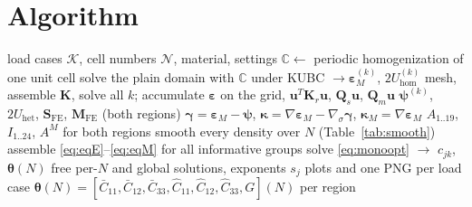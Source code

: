 \documentclass[11pt,a4paper]{article}
\newcommand{\C}{\mathbb{C}}                     %
\newcommand{\Cb}{\bar{\mathbb{C}}}              %
\newcommand{\Ch}{\hat{\mathbb{C}}}              %
\newcommand{\eps}{\bm{\varepsilon}}
\newcommand{\epsM}{\bm{\varepsilon}_{M}}
\newcommand{\bpsi}{\bm{\psi}}
\newcommand{\bgam}{\bm{\gamma}}
\newcommand{\bkap}{\bm{\kappa}}
\newcommand{\bu}{\bm{u}}
\newcommand{\bK}{\bm{K}}
\newcommand{\bth}{\bm{\theta}}
\newcommand{\Zset}{\mathcal{Z}}
\newcommand{\Nset}{\mathcal{N}}
\newcommand{\Kset}{\mathcal{K}}
\theoremstyle{plain}
\theoremstyle{remark}
\begin{document}
\section{Algorithm}
\begin{algorithm}[h]
\caption{Identification of $\Cb(N)$, $\Ch(N)$, $G(N)$}
\begin{algorithmic}[1]
\Require load cases $\Kset$, cell numbers $\Nset$, material, settings
\State $\C\gets$ periodic homogenization of one unit cell 
\State solve the plain domain with $\C$ under KUBC $\to\epsM^{(k)}$, $2U^{(k)}_{\mathrm{hom}}$ 
\For{$N\in\Nset$}
  \For{$\bm\zeta\in\Zset$} 
    \State mesh, assemble $\bK$, solve all $k$; accumulate $\eps$ on the grid, $\bu^T\bK_r\bu$, $\bm Q_s\bu$, $\bm Q_m\bu$
  \EndFor
  \State $\bpsi^{(k)}$, $2U_{\mathrm{het}}$, $\bm S_{\mathrm{FE}}$, $\bm M_{\mathrm{FE}}$ (both regions)
  \State $\bgam=\epsM-\bpsi$, $\bkap=\nabla\epsM-\nabla_\sigma\bgam$, $\bkap_M=\nabla\epsM$ 
  \State $A_{1..19}$, $I_{1..24}$, $A^M$ for both regions 
\EndFor
{}
  \State smooth every density over $N$ (Table~\ref{tab:smooth}) 
  \State assemble \eqref{eq:eqE}--\eqref{eq:eqM} for all informative groups 
  \State solve \eqref{eq:monoopt} $\to$ $c_{jk}$, $\bth(N)$ 
  \State free per-$N$ and global solutions, exponents $s_j$ 
  \State plots and one PNG per load case 
\EndFor
\Ensure $\bth(N)=[\bar C_{11},\bar C_{12},\bar C_{33},\hat C_{11},\hat C_{12},\hat C_{33},G](N)$ per region
\end{algorithmic}
\end{algorithm}
\end{document}
